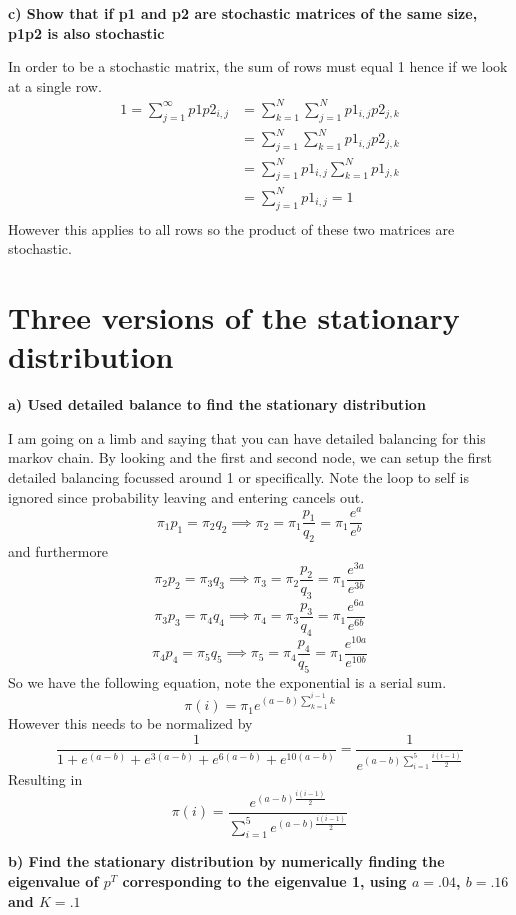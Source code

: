 \documentclass{article}
\begin{document}
\textbf{c) Show that if p1 and p2 are stochastic matrices of the same size, p1p2 is also stochastic}

In order to be a stochastic matrix, the sum of rows must equal 1 hence if we look at a single row.
\begin{align*}
    1 = \sum_{j=1}^\infty p1p2_{i,j} &= \sum_{k=1}^N\sum_{j=1}^N p1_{i,j}p2_{j,k}\\
    &= \sum_{j=1}^N\sum_{k=1}^N p1_{i,j}p2_{j,k}\\
    &= \sum_{j=1}^Np1_{i,j}\sum_{k=1}^N p1_{j,k}\\
    &= \sum_{j=1}^Np1_{i,j}=1\\
\end{align*}
However this applies to all rows so the product of these two matrices are stochastic.

\section{Three versions of the stationary distribution}
\textbf{a) Used detailed balance to find the stationary distribution}

I am going on a limb and saying that you can have detailed balancing for this markov chain. By looking and the first and second node, we can setup the first detailed balancing focussed around 1 or specifically. Note the loop to self is ignored since probability leaving and entering cancels out.
$$
\pi_{1}p_{1} = \pi_{2}q_{2} \implies \pi_{2} = \pi_{1} \frac{p_{1}}{q_{2}} = \pi_{1} \frac{e^{ a }}{e^{ b }}
$$
and furthermore
$$
\pi_{2}p_{2} = \pi_{3}q_{3} \implies \pi_{3} = \pi_{2} \frac{p_{2}}{q_{3}} = \pi_{1} \frac{e^{ 3a }}{e^{ 3b }}
$$
$$
\pi_{3}p_{3} = \pi_{4}q_{4} \implies \pi_{4} = \pi_{3} \frac{p_{3}}{q_{4}} = \pi_{1} \frac{e^{ 6a }}{e^{ 6b }}
$$
$$
\pi_{4}p_{4} = \pi_{5}q_{5} \implies \pi_{5} = \pi_{4} \frac{p_{4}}{q_{5}} = \pi_{1} \frac{e^{ 10a }}{e^{ 10b }}
$$
So we have the following equation, note the exponential is a serial sum.
$$
\pi(i) = \pi_{1}e^{ (a-b)\sum_{k=1}^{i-1}k }
$$
However this needs to be normalized by
$$
\frac{1}{1+e^{ (a-b) }+e^{ 3(a-b) }+e^{ 6(a-b) }+e^{ 10(a-b) }} = \frac{1}{e^{(a-b) \sum_{i=1}^5 \frac{i(i-1)}{2}}}
$$
Resulting in
$$
\pi(i) = \frac{e^{(a-b)\frac{i(i-1)}{2}}}{\sum_{i=1}^5e^{(a-b)  \frac{i(i-1)}{2}}}
$$

\textbf{b) Find the stationary distribution by numerically finding the eigenvalue of $p^T$ corresponding to the eigenvalue 1, using $a = .04$,  $b = .16$ and $K=.1$}
\end{document}
